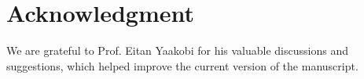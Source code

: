 \documentclass[11 pt]{article}
\numberwithin{equation}{section}
\begin{document}

\section*{Acknowledgment}
We are grateful to Prof. Eitan Yaakobi for his valuable discussions and suggestions, which helped improve the current version of the manuscript.








\end{document}
